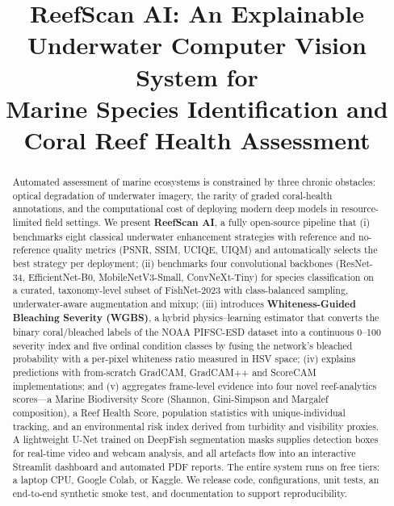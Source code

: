 \documentclass[conference]{IEEEtran}
\begin{document}
\title{ReefScan AI: An Explainable Underwater Computer Vision System for\\ Marine Species Identification and Coral Reef Health Assessment}

\author{
}

\maketitle

\begin{abstract}
Automated assessment of marine ecosystems is constrained by three chronic obstacles: optical degradation of underwater imagery, the rarity of graded coral-health annotations, and the computational cost of deploying modern deep models in resource-limited field settings. We present \textbf{ReefScan AI}, a fully open-source pipeline that (i) benchmarks eight classical underwater enhancement strategies with reference and no-reference quality metrics (PSNR, SSIM, UCIQE, UIQM) and automatically selects the best strategy per deployment; (ii) benchmarks four convolutional backbones (ResNet-34, EfficientNet-B0, MobileNetV3-Small, ConvNeXt-Tiny) for species classification on a curated, taxonomy-level subset of FishNet-2023 with class-balanced sampling, underwater-aware augmentation and mixup; (iii) introduces \textbf{Whiteness-Guided Bleaching Severity (WGBS)}, a hybrid physics--learning estimator that converts the binary coral/bleached labels of the NOAA PIFSC-ESD dataset into a continuous 0--100 severity index and five ordinal condition classes by fusing the network's bleached probability with a per-pixel whiteness ratio measured in HSV space; (iv) explains predictions with from-scratch GradCAM, GradCAM++ and ScoreCAM implementations; and (v) aggregates frame-level evidence into four novel reef-analytics scores---a Marine Biodiversity Score (Shannon, Gini-Simpson and Margalef composition), a Reef Health Score, population statistics with unique-individual tracking, and an environmental risk index derived from turbidity and visibility proxies. A lightweight U-Net trained on DeepFish segmentation masks supplies detection boxes for real-time video and webcam analysis, and all artefacts flow into an interactive Streamlit dashboard and automated PDF reports. The entire system runs on free tiers: a laptop CPU, Google Colab, or Kaggle. We release code, configurations, unit tests, an end-to-end synthetic smoke test, and documentation to support reproducibility.
\end{abstract}
\end{document}

